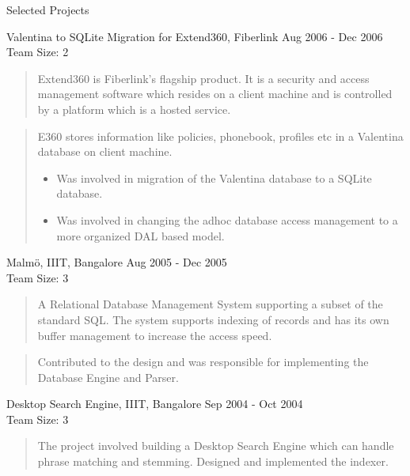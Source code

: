 \documentclass{resume}
\newcommand{\teamsize}{\\\sc\footnotesize Team Size: }
\begin{document}
\begin{category}{Selected Projects}{}
    \item {\topic Valentina to SQLite Migration for Extend360,} Fiberlink
        {\period Aug 2006 - Dec 2006}
        {\teamsize 2}
        \begin{quote}
            Extend360 is Fiberlink's flagship product. It is a security and
            access management software which resides on a client machine and is
            controlled by a platform which is a hosted service.
        \end{quote}
        \begin{quote}
            E360 stores information like policies, phonebook, profiles etc in a
            Valentina database on client machine.
            \begin{itemize}
                \item Was involved in migration of the Valentina database to a
                    SQLite database.
                \item Was involved in changing the adhoc database access management
                    to a more organized DAL based model.
            \end{itemize}
        \end{quote}

    \item {\topic Malm\"o,} IIIT, Bangalore %
        {\period Aug 2005 - Dec 2005}
        {\teamsize 3}
        \begin{quote}
            A Relational Database Management System supporting a subset of the
            standard SQL. The system supports indexing of records and has its
            own buffer management to increase the access speed.
        \end{quote}
        \begin{quote}
            Contributed to
            the design and was responsible for implementing the Database Engine
            and Parser.
         \end{quote}

    \item {\topic Desktop Search Engine,} IIIT, Bangalore
        {\period Sep 2004 - Oct 2004}
        {\teamsize 3}
        \begin{quote}
            The project involved building a Desktop Search Engine which can
            handle phrase matching and stemming. Designed and implemented the indexer.
        \end{quote}

\end{category}
\end{document}
